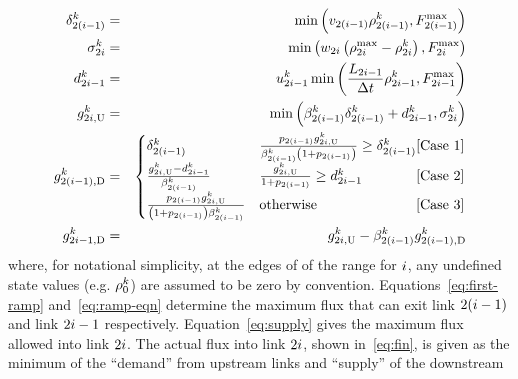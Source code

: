 			\begin{eqnarray}
				\demand_{2\left(\link-1\right)}^{\tind} & = & \min\left(\ffspeed_{2\left(i-1\right)}\densitydiscrete{2\left(\link-1\right)}{\tind},F_{2\left(\link-1\right)}^{\max}\right)\label{eq:first-ramp}\\
				\supply_{2\link}^{\tind} & = & \min\left(\congspeed_{2i}\left(\density_{2i}^{\max}-\densitydiscrete{2\link}{\tind}\right),F_{2i}^{\max}\right)\label{eq:supply}\\
				\rampDemand_{2\link-1}^{\tind} & = & \ramp_{2\link-1}^{\tind}\min\left(\frac{\length_{2\link-1}}{\Delta t}\densitydiscrete{2\link-1}{\tind},F_{2i-1}^{\max}\right)\label{eq:ramp-eqn}\\
				\fin{2\link}{\tind} & = & \min\left(\splitratio_{2\left(\link-1\right)}^{\tind}\demand_{2\left(\link-1\right)}^{\tind}+\rampDemand_{2\link-1}^{\tind},\supply_{2\link}^{\tind}\right)\label{eq:fin}\\
				\fout{2\left(\link-1\right)}{\tind} & = & \begin{cases}
				\demand_{2\left(\link-1\right)}^{\tind} & \frac{p_{2(\link-1)}\fin{2\link}{\tind}}{\splitratio_{2\left(\link-1\right)}^{\tind}\left(1+p_{2(\link-1)}\right)}\ge\demand_{2\left(\link-1\right)}^{\tind}\hfill\text{[Case 1]}\\
				\frac{\fin{2\link}{\tind}-\rampDemand_{2\link-1}^{\tind}}{\splitratio_{2\left(\link-1\right)}^{\tind}} & \frac{\fin{2\link}{\tind}}{1+p_{2(\link-1)}}\ge\rampDemand_{2\link-1}^{\tind}\hfill\text{[Case 2}]\\
				\frac{p_{2(\link-1)}\fin{2\link}{\tind}}{\left(1+p_{2(\link-1)}\right)\splitratio_{2\left(\link-1\right)}^{\tind}} & \text{otherwise}\hfill[\text{Case 3]}
				\end{cases}\label{eq:merge}\\
				\fout{2\link-1}{\tind} & = & \fin{2\link}{\tind}-\splitratio_{2\left(\link-1\right)}^{\tind}\fout{2\left(\link-1\right)}{\tind}\label{eq:last-ramp}
			\end{eqnarray}
			where, for notational simplicity, at the edges of of the range for
			$i$, any undefined state values (e.g. $\rho_{0}^{k}$)
			are assumed to be zero by convention. Equations~\eqref{eq:first-ramp}
			and~\eqref{eq:ramp-eqn} determine the maximum flux that can exit
			link $2(i-1)$ and link $2i-1$ respectively. Equation~\eqref{eq:supply}
			gives the maximum flux allowed into link $2i$. The actual flux
			into link $2i$, shown in~\eqref{eq:fin}, is given as the minimum
			of the ``demand'' from upstream links and ``supply'' of the downstream
